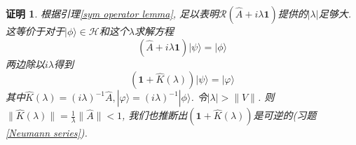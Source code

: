 \documentclass[a4paper,11pt]{article}
\theoremstyle{mystyle}
\newtheorem{Proof}{\hspace{2em}证明}[section]
\begin{document}
\begin{Proof}
  根据引理\ref{sym operator lemma}, 足以表明$\mathcal{R}(\hat{A}+i\lambda\mathbf{1})$提供的$|\lambda|$足够大. 这等价于对于$|\phi\rangle\in\mathcal{H}$和这个$\lambda$求解方程
\begin{equation*}
  (\hat{A}+i\lambda\mathbf{1})|\psi\rangle=|\phi\rangle
\end{equation*}
两边除以$i\lambda$得到
\begin{equation*}
  (\mathbf{1}+\hat{K}(\lambda))|\psi\rangle=|\varphi\rangle
\end{equation*}
其中$\hat{K}(\lambda)=(i\lambda)^{-1}\hat{A}, |\varphi\rangle=(i\lambda)^{-1}|\phi\rangle$. 令$|\lambda|>\|V\|$. 则$\|\hat{K}(\lambda)\|=\frac{1}{\lambda}\|\hat{A}\|<1$, 我们也推断出$(\mathbf{1}+\hat{K}(\lambda))$是可逆的(习题\ref{Neumann series}).
\end{Proof}
\end{document}
